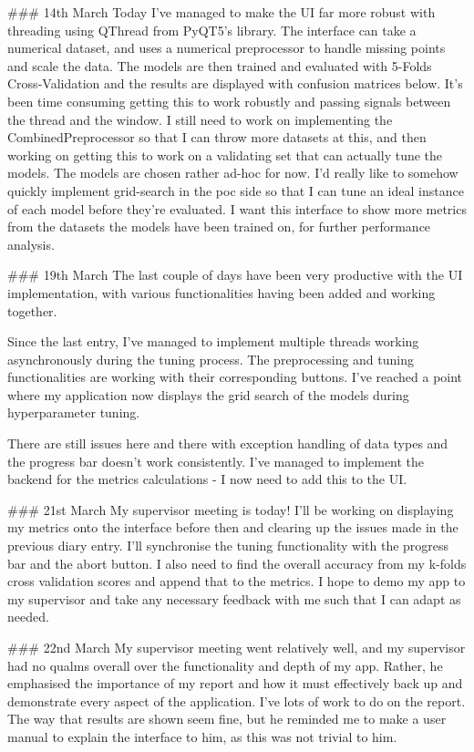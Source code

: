 \documentclass[letterpaper,10pt]{article}
\begin{document}
\begin{markdown}
### 14th March
Today I've managed to make the UI far more robust with threading using QThread from PyQT5's library. The interface can take a numerical dataset, and uses a numerical preprocessor to handle missing points and scale the data. The models are then trained and evaluated with 5-Folds Cross-Validation and the results are displayed with confusion matrices below. It's been time consuming getting this to work robustly and passing signals between the thread and the window.  
I still need to work on implementing the CombinedPreprocessor so that I can throw more datasets at this, and then working on getting this to work on a validating set that can actually tune the models. The models are chosen rather ad-hoc for now. I'd really like to somehow quickly implement grid-search in the poc side so that I can tune an ideal instance of each model before they're evaluated.  
I want this interface to show more metrics from the datasets the models have been trained on, for further performance analysis. 

### 19th March
The last couple of days have been very productive with the UI implementation, with various functionalities having been added and working together.  
  
 Since the last entry, I've managed to implement multiple threads working asynchronously during the tuning process. The preprocessing and tuning functionalities are working with their corresponding buttons. I've reached a point where my application now displays the grid search of the models during hyperparameter tuning.
   
There are still issues here and there with exception handling of data types and the progress bar doesn't work consistently. I've managed to implement the backend for the metrics calculations - I now need to add this to the UI.
  
### 21st March
My supervisor meeting is today! I'll be working on displaying my metrics onto the interface before then and clearing up the issues made in the previous diary entry.  
I'll synchronise the tuning functionality with the progress bar and the abort button. I also need to find the overall accuracy from my k-folds cross validation scores and append that to the metrics.  
I hope to demo my app to my supervisor and take any necessary feedback with me such that I can adapt as needed.

### 22nd March
My supervisor meeting went relatively well, and my supervisor had no qualms overall over the functionality and depth of my app. Rather, he emphasised the importance of my report and how it must effectively back up and demonstrate every aspect of the application. I've lots of work to do on the report. The way that results are shown seem fine, but he reminded me to make a user manual to explain the interface to him, as this was not trivial to him.
  

\end{markdown}
\end{document}

